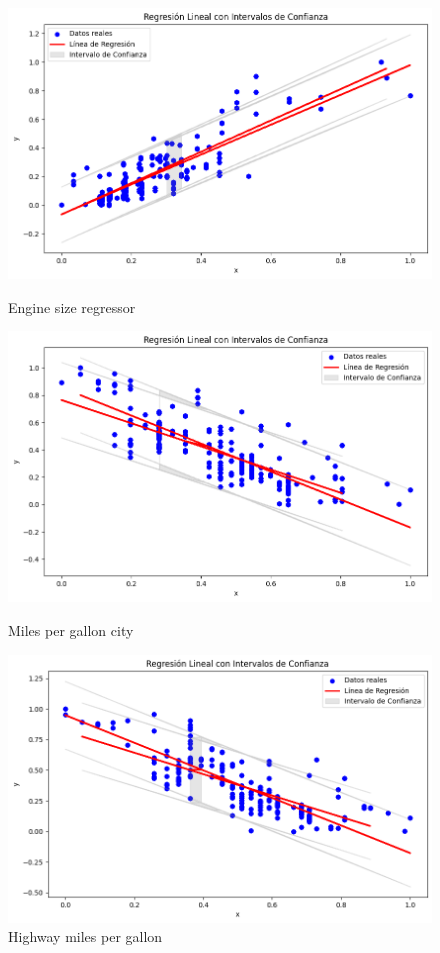 \documentclass{article}
\begin{document}
  \begin{figure}[H]
    \centering
    \begin{minipage}[b]{0.3\textwidth}
        \centering
        \includegraphics[width=\textwidth]{image1.png}
        \caption*{Engine size regressor}
    \end{minipage}
    \begin{minipage}[b]{0.3\textwidth}
        \centering
        \includegraphics[width=\textwidth]{image2.png}
        \caption*{Miles per gallon city}
    \end{minipage}
    \begin{minipage}[b]{0.3\textwidth}
        \centering
        \includegraphics[width=\textwidth]{image3.png}
        \caption*{Highway miles per gallon}
    \end{minipage}


\end{figure}
\end{document}
